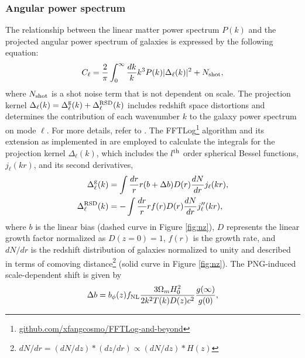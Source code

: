 \subsubsection{Angular power spectrum}
The relationship between the linear matter power spectrum $P(k)$ and the projected angular power spectrum of galaxies is expressed by the following equation:
\begin{equation}\label{eq:cell}
C_{\ell} = \frac{2}{\pi}\int_{0}^{\infty}\frac{dk}{k}k^{3}P(k)|\Delta_{\ell}(k)|^{2} + N_{\rm shot},
\end{equation}
where $N_{\rm shot}$ is a shot noise term that is not dependent on scale. The projection kernel $\Delta_{\ell}(k) = \Delta^{\rm g}_{\ell}(k) + \Delta^{\rm RSD}_{\ell}(k)$ includes redshift space distortions and determines the contribution of each wavenumber $k$ to the galaxy power spectrum on mode $\ell$. For more details, refer to \cite{Padmanabhan2007}. The FFTLog\footnote{\href{https://github.com/xfangcosmo/FFTLog-and-beyond}{github.com/xfangcosmo/FFTLog-and-beyond}} algorithm and its extension as implemented in \cite{fang2020beyond} are employed to calculate the integrals for the projection kernel $\Delta_{\ell}(k)$, which includes the $l^{\rm th}$ order spherical Bessel functions, $ j_{\ell}(kr)$, and its second derivatives,
\begin{align}
    \Delta^{\rm g}_{\ell}(k) &= \int \frac{dr}{r} r (b+\Delta b) D(r) \frac{dN}{dr} j_{\ell}(kr),\\
    \Delta^{\rm RSD}_{\ell}(k) &= - \int \frac{dr}{r} r f(r) D(r) \frac{dN}{dr} j^{\prime\prime}_{\ell}(kr),
\end{align}
where $b$ is the linear bias (dashed curve in Figure \ref{fig:nz}), $D$ represents the linear growth factor normalized as $D(z=0)=1$, $f(r)$ is the growth rate, and $dN/dr$ is the redshift distribution of galaxies normalized to unity and described in terms of comoving distance\footnote{$dN/dr = (dN/dz)*(dz/dr) \propto (dN/dz)*H(z)$} (solid curve in Figure \ref{fig:nz}). The PNG-induced scale-dependent shift is given by \citep[see, also,][]{slosar2008constraints}
\begin{equation}
\Delta b = b_{\phi}(z) f_{\rm NL} \frac{3 \Omega_{m} H^{2}_{0}}{2 k^{2}T(k)D(z) c^{2}} \frac{g(\infty)}{g(0)},
\label{eq:scaledepbias}
\end{equation}
